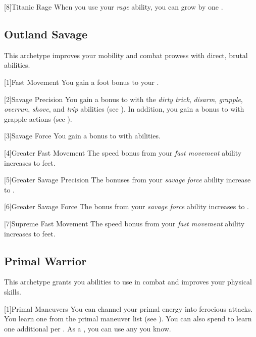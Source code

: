        [8]{Titanic Rage}
        When you use your \textit{rage} ability, you can grow by one .

    \subsection{Outland Savage}
        This archetype improves your mobility and combat prowess with direct, brutal abilities.

        [1]{Fast Movement} You gain a  foot bonus to your .

        [2]{Savage Precision} You gain a  bonus to  with the \textit{dirty trick}, \textit{disarm}, \textit{grapple}, \textit{overrun}, \textit{shove}, and \textit{trip} abilities (see ).
        In addition, you gain a  bonus to  with grapple actions (see ).

        [3]{Savage Force} You gain a  bonus to  with  abilities.

        [4]{Greater Fast Movement} The speed bonus from your \textit{fast movement} ability increases to  feet.

        [5]{Greater Savage Precision} The bonuses from your \textit{savage force} ability increase to .

        [6]{Greater Savage Force} The bonus from your \textit{savage force} ability increases to .

        [7]{Supreme Fast Movement} The speed bonus from your \textit{fast movement} ability increases to  feet.

    \subsection{Primal Warrior}
        This archetype grants you abilities to use in combat and improves your physical skills.

        [1]{Primal Maneuvers}
        You can channel your primal energy into ferocious attacks.
        You learn one  from the primal maneuver list (see ).
        You can also spend  to learn one additional  per .
        As a , you can use any  you know.


